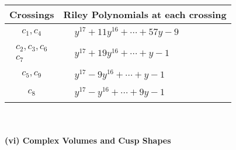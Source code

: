 \documentclass[1p]{elsarticle_modified}
\theoremstyle{definition}
\begin{document}
\begin{tabular}{m{50pt}|m{274pt}}
Crossings & \hspace{64pt}Riley Polynomials at each crossing \\
\hline $$\begin{aligned}c_{1},c_{4}\end{aligned}$$&$\begin{aligned}
&y^{17}+11 y^{16}+\cdots+57 y-9
\end{aligned}$\\
\hline $$\begin{aligned}c_{2},c_{3},c_{6}\\c_{7}\end{aligned}$$&$\begin{aligned}
&y^{17}+19 y^{16}+\cdots+y-1
\end{aligned}$\\
\hline $$\begin{aligned}c_{5},c_{9}\end{aligned}$$&$\begin{aligned}
&y^{17}-9 y^{16}+\cdots+y-1
\end{aligned}$\\
\hline $$\begin{aligned}c_{8}\end{aligned}$$&$\begin{aligned}
&y^{17}- y^{16}+\cdots+9 y-1
\end{aligned}$\\
\hline
\end{tabular}\\~\\
\newpage\flushleft \textbf{(vi) Complex Volumes and Cusp Shapes}
\end{document}
